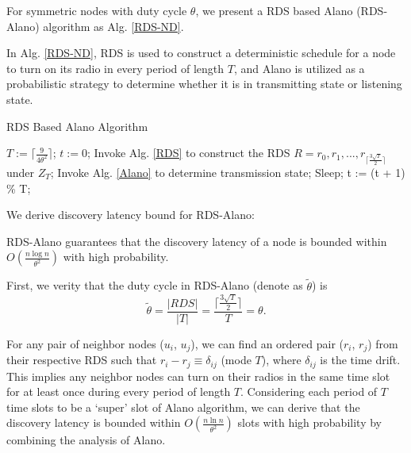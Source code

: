 For symmetric nodes with duty cycle $\theta$, we present a RDS based Alano (RDS-Alano) algorithm as Alg. \ref{RDS-ND}.

In Alg. \ref{RDS-ND}, RDS is used to construct a deterministic
schedule for a node to turn on its radio in every period of length $T$,
and Alano is utilized as a probabilistic strategy to
determine whether it is in transmitting state or listening state.

\begin{algorithm}
\caption{RDS Based Alano Algorithm}
\label{RDS-ND}
\begin{algorithmic}[1]
\STATE $T := \lceil \frac{9}{4\theta^{2}} \rceil$; $t := 0$;
\STATE Invoke Alg. \ref{RDS} to construct the RDS $R = {r_0, r_1, ...,r_{\lceil \frac{3\sqrt{T}}{2}  \rceil}}$ under $Z_T$;
    		\STATE Invoke Alg. \ref{Alano} to determine transmission state;
	\ELSE
    		\STATE Sleep;
	\ENDIF
	\STATE t := (t + 1) \% T;
\ENDWHILE
\end{algorithmic}
\end{algorithm}


We derive discovery latency bound for RDS-Alano:

\begin{theorem}
\label{theoremRDS}
RDS-Alano guarantees that the discovery latency of a node
is bounded within $O(\frac{n\log n}{\theta^2})$ with high probability.
\end{theorem}

\begin{IEEEproof}
First, we verity that the duty cycle in RDS-Alano (denote as $\widetilde{\theta}$) is
$$
\widetilde{\theta} = \frac{|RDS|}{|T|} = \frac{\lceil \frac{3\sqrt{T}}{2}  \rceil}{T} = \theta.
$$

For any pair of neighbor nodes ($u_i$, $u_j$),
we can find an ordered pair ($r_i$, $r_j$) from their respective RDS
such that $r_i - r_j \equiv \delta_{ij}$ (mode $T$), where $\delta_{ij}$ is the time drift.
This implies any neighbor nodes can turn on their radios in the same time slot for at least once during every period of length $T$. 
Considering each period of $T$ time slots to be a `super' slot of Alano algorithm, we can derive that the discovery latency is bounded within $O(\frac{n\ln n}{\theta^2})$ slots with high probability by combining the analysis of Alano.
\end{IEEEproof}

